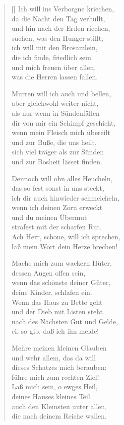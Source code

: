 \begin{multicols}{2}
\begin{verse}[\versewidth]
 Ich will ins Verborgne kriechen,\\
da die Nacht den Tag verhüllt,\\
und hin nach der Erden riechen,\\
suchen, was den Hunger stillt;\\
ich will mit den Brosamlein,\\
die ich finde, friedlich sein\\
und mich freuen über allen,\\
was die Herren lassen fallen.

 Murren will ich auch und bellen,\\
aber gleichwohl weiter nicht,\\
als nur wenn in Sündenfällen\\
dir von mir ein Schimpf geschicht,\\
wenn mein Fleisch mich übereilt\\
und zur Buße, die uns heilt,\\
sich viel träger als zur Sünden\\
und zur Bosheit lässet finden.

 Dennoch will ohn alles Heucheln,\\
das so fest sonst in uns steckt,\\
ich dir auch hinwieder schmeicheln,\\
wenn ich deinen Zorn erweckt\\
und du meinen Übermut\\
strafest mit der scharfen Rut.\\
Ach Herr, schone, will ich sprechen,\\
laß mein Wort dein Herze brechen!

 Mache mich zum wackern Hüter,\\
dessen Augen offen sein,\\
wenn das schönste deiner Güter,\\
deine Kinder, schlafen ein.\\
Wenn das Haus zu Bette geht\\
und der Dieb mit Listen steht\\
nach des Nächsten Gut und Gelde,\\
ei, so gib, daß ich ihn melde!

 Mehre meinen kleinen Glauben\\
und wehr allem, das da will\\
dieses Schatzes mich berauben;\\
führe mich zum rechten Ziel!\\
Laß mich sein, o ewges Heil,\\
deines Hauses kleines Teil\\
auch den Kleinsten unter allen,\\
die nach deinem Reiche wallen.


\end{verse}
\end{multicols}
